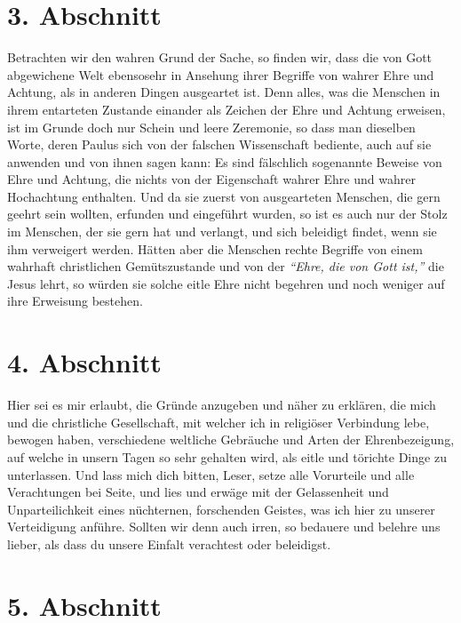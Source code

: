 \section{3. Abschnitt} \label{kap9_ab3}

Betrachten wir den wahren Grund der Sache, so finden wir, dass die von Gott
abgewichene Welt ebensosehr in Ansehung ihrer Begriffe von wahrer Ehre und
Achtung, als in anderen Dingen ausgeartet ist. Denn alles, was die Menschen in
ihrem entarteten Zustande einander als Zeichen der Ehre und Achtung erweisen,
ist im Grunde doch nur Schein und leere Zeremonie, so dass man dieselben Worte,
deren Paulus sich von der falschen
Wissenschaft bediente, auch auf sie
anwenden und von ihnen sagen kann: Es sind fälschlich sogenannte Beweise von
Ehre und Achtung, die nichts von der Eigenschaft wahrer Ehre und wahrer
Hochachtung enthalten. Und da sie zuerst von ausgearteten Menschen, die gern
geehrt sein wollten, erfunden und eingeführt wurden, so ist es auch nur der
Stolz im Menschen, der sie gern hat und verlangt, und sich beleidigt findet,
wenn sie ihm verweigert werden. Hätten aber die Menschen rechte Begriffe von
einem wahrhaft christlichen Gemütszustande und von der
\textit{"`Ehre, die von Gott ist,"'}
die Jesus lehrt, so würden sie solche eitle
Ehre nicht begehren und noch weniger auf ihre Erweisung bestehen.

\section{4. Abschnitt} \label{kap9_ab4}

Hier sei es mir erlaubt, die Gründe anzugeben und näher zu erklären, die mich
und die christliche Gesellschaft, mit welcher ich in religiöser Verbindung lebe,
bewogen haben, verschiedene weltliche Gebräuche und Arten der Ehrenbezeigung,
auf welche in unsern Tagen so sehr gehalten wird, als eitle und törichte Dinge
zu unterlassen. Und lass mich dich bitten, Leser, setze alle Vorurteile und alle
Verachtungen bei Seite, und lies und erwäge mit der Gelassenheit und
Unparteilichkeit eines nüchternen, forschenden Geistes, was ich hier zu unserer
Verteidigung anführe. Sollten wir denn auch irren, so bedauere und belehre uns
lieber, als dass du unsere Einfalt verachtest oder beleidigst.

\section{5. Abschnitt} \label{kap9_ab5}

